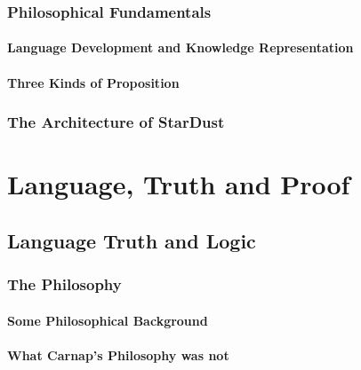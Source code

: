 \section{Philosophical Fundamentals}\label{philosophical-fundamentals}

\subsection{Language Development and Knowledge Representation}\label{language-development-and-knowledge-representation}

\subsection{Three Kinds of Proposition}\label{three-kinds-of-proposition}

\section{The Architecture of StarDust}\label{the-architecture-of-stardust}


\part{Language, Truth and Proof}\label{language,-truth-and-proof}

\chapter{Language Truth and Logic}\label{language-truth-and-logic}

\section{The Philosophy}\label{the-philosophy}

\subsection{Some Philosophical Background}\label{some-philosophical-background}

\subsection{What Carnap's Philosophy was not}\label{what-carnaps-philosophy-was-not}

